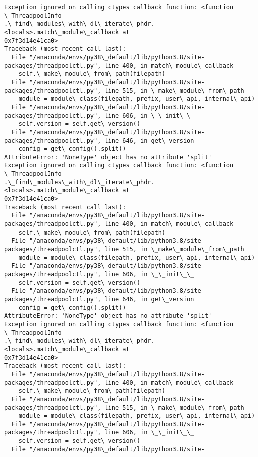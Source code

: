 \documentclass[11pt]{article}
\begin{document}
\begin{Verbatim}[commandchars=\\\{\}]
Exception ignored on calling ctypes callback function: <function \_ThreadpoolInfo
.\_find\_modules\_with\_dl\_iterate\_phdr.<locals>.match\_module\_callback at
0x7f3d14e41ca0>
Traceback (most recent call last):
  File "/anaconda/envs/py38\_default/lib/python3.8/site-
packages/threadpoolctl.py", line 400, in match\_module\_callback
    self.\_make\_module\_from\_path(filepath)
  File "/anaconda/envs/py38\_default/lib/python3.8/site-
packages/threadpoolctl.py", line 515, in \_make\_module\_from\_path
    module = module\_class(filepath, prefix, user\_api, internal\_api)
  File "/anaconda/envs/py38\_default/lib/python3.8/site-
packages/threadpoolctl.py", line 606, in \_\_init\_\_
    self.version = self.get\_version()
  File "/anaconda/envs/py38\_default/lib/python3.8/site-
packages/threadpoolctl.py", line 646, in get\_version
    config = get\_config().split()
AttributeError: 'NoneType' object has no attribute 'split'
Exception ignored on calling ctypes callback function: <function \_ThreadpoolInfo
.\_find\_modules\_with\_dl\_iterate\_phdr.<locals>.match\_module\_callback at
0x7f3d14e41ca0>
Traceback (most recent call last):
  File "/anaconda/envs/py38\_default/lib/python3.8/site-
packages/threadpoolctl.py", line 400, in match\_module\_callback
    self.\_make\_module\_from\_path(filepath)
  File "/anaconda/envs/py38\_default/lib/python3.8/site-
packages/threadpoolctl.py", line 515, in \_make\_module\_from\_path
    module = module\_class(filepath, prefix, user\_api, internal\_api)
  File "/anaconda/envs/py38\_default/lib/python3.8/site-
packages/threadpoolctl.py", line 606, in \_\_init\_\_
    self.version = self.get\_version()
  File "/anaconda/envs/py38\_default/lib/python3.8/site-
packages/threadpoolctl.py", line 646, in get\_version
    config = get\_config().split()
AttributeError: 'NoneType' object has no attribute 'split'
Exception ignored on calling ctypes callback function: <function \_ThreadpoolInfo
.\_find\_modules\_with\_dl\_iterate\_phdr.<locals>.match\_module\_callback at
0x7f3d14e41ca0>
Traceback (most recent call last):
  File "/anaconda/envs/py38\_default/lib/python3.8/site-
packages/threadpoolctl.py", line 400, in match\_module\_callback
    self.\_make\_module\_from\_path(filepath)
  File "/anaconda/envs/py38\_default/lib/python3.8/site-
packages/threadpoolctl.py", line 515, in \_make\_module\_from\_path
    module = module\_class(filepath, prefix, user\_api, internal\_api)
  File "/anaconda/envs/py38\_default/lib/python3.8/site-
packages/threadpoolctl.py", line 606, in \_\_init\_\_
    self.version = self.get\_version()
  File "/anaconda/envs/py38\_default/lib/python3.8/site-

\end{Verbatim}
\end{document}
